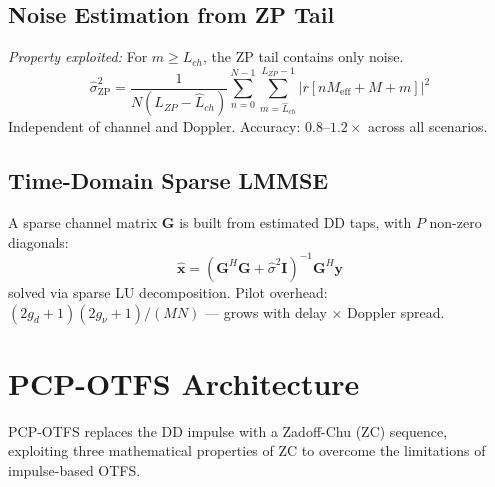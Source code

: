 \documentclass[11pt,a4paper,twoside]{article}
\newcommand{\nest}{\hat{\sigma}^2}
\newcommand{\xhat}{\hat{\mathbf{x}}}
\newcommand{\G}{\mathbf{G}}
\newcommand{\I}{\mathbf{I}}
\newcommand{\y}{\mathbf{y}}
\begin{document}
\subsection{Noise Estimation from ZP Tail}
\label{sec:zp_noise}

\textit{Property exploited:} For $m \geq L_{ch}$, the ZP tail contains only noise.
\begin{equation}
    \boxed{\nest_{\text{ZP}} = \frac{1}{N(L_{ZP} - \hat{L}_{ch})} \sum_{n=0}^{N-1} \sum_{m=\hat{L}_{ch}}^{L_{ZP}-1} |r[n M_{\text{eff}} + M + m]|^2}
    \label{eq:noise_zp}
\end{equation}
Independent of channel and Doppler. Accuracy: $0.8$--$1.2\times$ across all scenarios.

\subsection{Time-Domain Sparse LMMSE}

A sparse channel matrix $\G$ is built from estimated DD taps, with $P$ non-zero diagonals:
\begin{equation}
    \xhat = (\G^H\G + \nest \I)^{-1} \G^H \y
\end{equation}
solved via sparse LU decomposition. Pilot overhead: $(2g_d{+}1)(2g_\nu{+}1)/(MN)$ --- grows with delay $\times$ Doppler spread.

\section{PCP-OTFS Architecture}
\label{sec:pcp_otfs}

PCP-OTFS \cite{pcp2023} replaces the DD impulse with a Zadoff-Chu (ZC) sequence, exploiting three mathematical properties of ZC to overcome the limitations of impulse-based OTFS.
\end{document}
